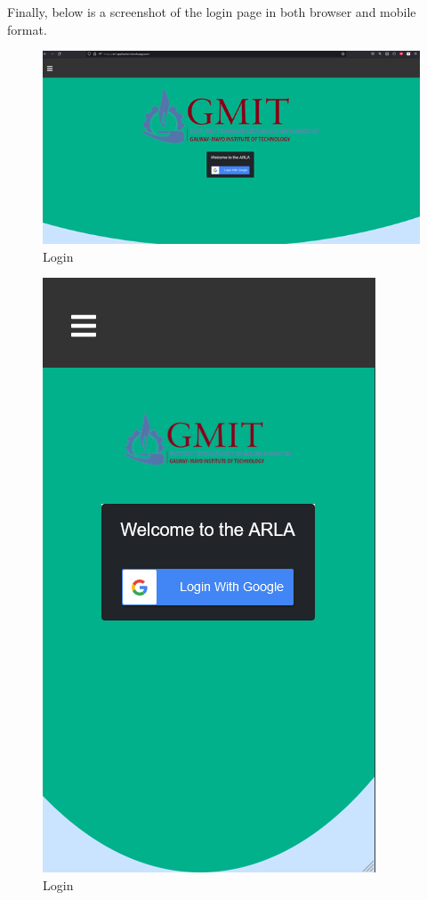 Finally, below is a screenshot of the login page in both browser and mobile format.\\
\begin{figure}[H]
    \centering
    \includegraphics{img/Login2.png}
    \caption{Login}
    \label{fig:my_label}
\end{figure}

\begin{figure}[H]
    \centering
    \includegraphics{img/Login3.png}
    \caption{Login}
    \label{fig:my_label}
\end{figure}

